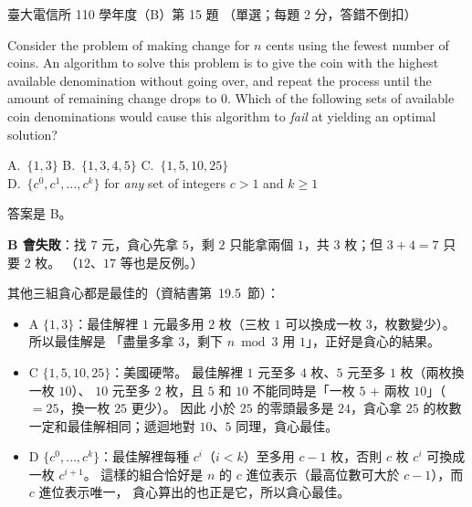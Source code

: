 \begin{pastexam}[label={px:ntu-110-comm-dsa-15}]{臺大電信所 110 學年度（B）第 15 題}
（單選；每題 2 分，答錯不倒扣）

Consider the problem of making change for $n$ cents using the fewest number of coins. An algorithm to solve this problem is to give the coin with the highest available denomination without going over, and repeat the process until the amount of remaining change drops to 0. Which of the following sets of available coin denominations would cause this algorithm to \textit{fail} at yielding an optimal solution?

A.~$\{1,3\}$ \qquad B.~$\{1,3,4,5\}$ \qquad C.~$\{1,5,10,25\}$\\
D.~$\{c^0,c^1,\ldots,c^k\}$ for \textit{any} set of integers $c>1$ and $k\ge 1$
\end{pastexam}

\begin{pastsoln}
答案是 B。

\textbf{B 會失敗}：找 $7$ 元，貪心先拿 $5$，剩 $2$ 只能拿兩個 $1$，共 $3$ 枚；但 $3 + 4 = 7$ 只要 $2$ 枚。
（$12$、$17$ 等也是反例。）

其他三組貪心都是最佳的（資結書第~19.5~節）：
\begin{itemize}
\item A $\{1, 3\}$：最佳解裡 $1$ 元最多用 $2$ 枚（三枚 $1$ 可以換成一枚 $3$，枚數變少）。 所以最佳解是
「盡量多拿 $3$，剩下 $n \bmod 3$ 用 $1$」，正好是貪心的結果。
\item C $\{1, 5, 10, 25\}$：美國硬幣。 最佳解裡 $1$ 元至多 $4$ 枚、$5$ 元至多 $1$ 枚（兩枚換一枚 $10$）、
$10$ 元至多 $2$ 枚，且 $5$ 和 $10$ 不能同時是「一枚 $5$ + 兩枚 $10$」（$=25$，換一枚 $25$ 更少）。 因此
小於 $25$ 的零頭最多是 $24$，貪心拿 $25$ 的枚數一定和最佳解相同；遞迴地對 $10$、$5$ 同理，貪心最佳。
\item D $\{c^0, \ldots, c^k\}$：最佳解裡每種 $c^i$（$i < k$）至多用 $c - 1$ 枚，否則 $c$ 枚 $c^i$ 可換成
一枚 $c^{i+1}$。 這樣的組合恰好是 $n$ 的 $c$ 進位表示（最高位數可大於 $c - 1$），而 $c$ 進位表示唯一，
貪心算出的也正是它，所以貪心最佳。
\end{itemize}
\end{pastsoln}
